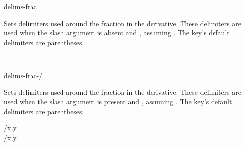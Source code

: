 \begin{option}{delims-frac}
	\begin{values}[default = (~)]
	\end{values}
	Sets delimiters used around the fraction in the derivative. These delimiters are used when the slash argument is absent and , assuming . The key's default delimiters are parentheses.
	\begin{example}
		 \\
	\end{example}
\end{option}

\begin{option}{delims-frac-/}
	\begin{values}[default = (~)]
		\meta{right delimiter}
	\end{values}
	Sets delimiters used around the fraction in the derivative. These delimiters are used when the slash argument is present and , assuming . The key's default delimiters are parentheses.
	\begin{example}
		/{x,y} \\
		/{x,y}
	\end{example}
\end{option}


